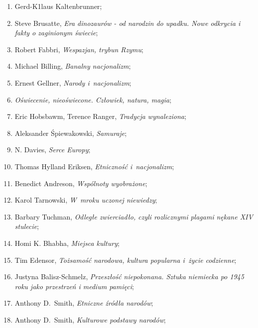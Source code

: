 \documentclass[a4paper,11pt]{article}
\begin{document}
\begin{enumerate}
\item Gerd-K1laus Kaltenbrunner;

\item Steve Brusatte, \textit{Era dinozaurów - od narodzin do upadku.
    Nowe odkrycia i fakty o zaginionym świecie};

\item Robert Fabbri, \textit{Wespazjan, trybun Rzymu};

\item Michael Billing, \textit{Banalny nacjonalizm};

\item Ernest Gellner, \textit{Narody i~nacjonalizm};

\item \textit{Oświecenie, nieoświecone. Człowiek, natura, magia};

\item Eric Hobsbawm, Terence Ranger, \textit{Tradycja wynaleziona};

\item Aleksander Śpiewakowski, \textit{Samuraje};

\item N. Davies, \textit{Serce Europy};

\item Thomas Hylland Eriksen, \textit{Etniczność i~nacjonalizm};

\item Benedict Andreson, \textit{Wspólnoty wyobrażone};

\item Karol Tarnowski, \textit{W~mroku uczonej niewiedzy};

\item Barbary Tuchman, \textit{Odległe zwierciadło, czyli rozlicznymi
    plagami nękane XIV stulecie};

\item Homi K. Bhabha, \textit{Miejsca kultury};

\item Tim Edensor, \textit{Tożsamość narodowa, kultura popularna i~życie
    codzienne};

\item Justyna Balisz-Schmelz, \textit{Przeszłość niepokonana. Sztuka
    niemiecka po 1945 roku jako przestrzeń i medium pamięci};

\item Anthony D.~Smith, \textit{Etniczne źródła narodów};

\item Anthony D.~Smith, \textit{Kulturowe podstawy narodów};


\end{enumerate}
\end{document}
